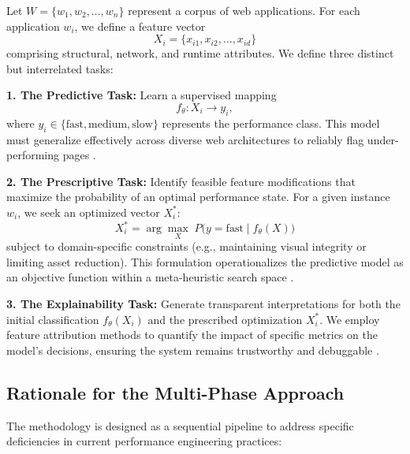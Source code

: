 \documentclass[sn-nature]{sn-jnl}
\begin{document}
Let \( W = \{w_1, w_2, \dots, w_n\} \) represent a corpus of web applications. For each application \( w_i \), we define a feature vector
\[
X_i = \{x_{i1}, x_{i2}, \dots, x_{id}\}
\]
comprising structural, network, and runtime attributes. We define three distinct but interrelated tasks:

\textbf{1. The Predictive Task:} Learn a supervised mapping
\[
f_{\theta} : X_i \rightarrow y_i,
\]
where \( y_i \in \{\text{fast}, \text{medium}, \text{slow}\} \) represents the performance class. This model must generalize effectively across diverse web architectures to reliably flag under-performing pages \cite{ghattas2025, sehwag2024}.

\textbf{2. The Prescriptive Task:} Identify feasible feature modifications that maximize the probability of an optimal performance state. For a given instance \( w_i \), we seek an optimized vector \( X_i^{*} \):
\[
X_i^{*} = \arg\max_{X} \; P\bigl(y = \text{fast} \mid f_{\theta}(X)\bigr)
\]
subject to domain-specific constraints (e.g., maintaining visual integrity or limiting asset reduction). This formulation operationalizes the predictive model as an objective function within a meta-heuristic search space \cite{notz2024, asha2025}.

\textbf{3. The Explainability Task:} Generate transparent interpretations for both the initial classification \( f_{\theta}(X_i) \) and the prescribed optimization \( X_i^{*} \). We employ feature attribution methods to quantify the impact of specific metrics on the model's decisions, ensuring the system remains trustworthy and debuggable \cite{salih2024, goldwasser2024}.

\subsection{Rationale for the Multi-Phase Approach}

The methodology is designed as a sequential pipeline to address specific deficiencies in current performance engineering practices:
\end{document}
